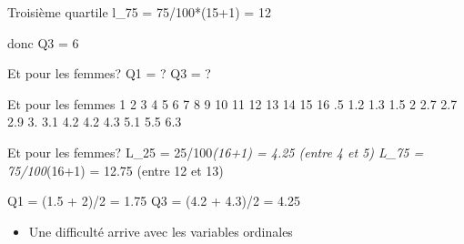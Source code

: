 \documentclass[
  ignorenonframetext,
]{beamer}
\providecommand{\tightlist}{%
  \setlength{\itemsep}{0pt}\setlength{\parskip}{0pt}}
\begin{document}
\begin{frame}{Troisième quartile}
\protect\hypertarget{troisiuxe8me-quartile}{}
l\_75 = 75/100*(15+1) = 12

donc Q3 = 6
\end{frame}

\begin{frame}{Et pour les femmes?}
\protect\hypertarget{et-pour-les-femmes}{}
Q1 = ? Q3 = ?
\end{frame}

\begin{frame}{Et pour les femmes}
\protect\hypertarget{et-pour-les-femmes-1}{}
1 2 3 4 \textbar{} 5 6 7 8 \textbar{} 9 10 11 12 \textbar{} 13 14 15 16
.5 1.2 1.3 1.5 \textbar{} 2 2.7 2.7 2.9 \textbar{} 3. 3.1 4.2 4.2
\textbar{} 4.3 5.1 5.5 6.3
\end{frame}

\begin{frame}{Et pour les femmes?}
\protect\hypertarget{et-pour-les-femmes-2}{}
L\_25 = 25/100\emph{(16+1) = 4.25 (entre 4 et 5) L\_75 = 75/100}(16+1) =
12.75 (entre 12 et 13)

Q1 = (1.5 + 2)/2 = 1.75 Q3 = (4.2 + 4.3)/2 = 4.25

\begin{itemize}
\tightlist
\item
  Une difficulté arrive avec les variables ordinales
\end{itemize}
\end{frame}
\end{document}
